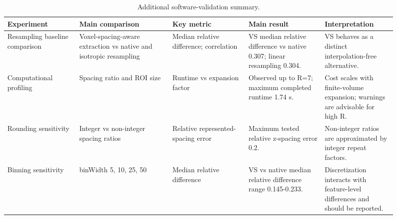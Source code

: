 \begin{table}[htbp]
\centering
\small
\caption{Additional software-validation summary.}
\begin{tabular}{p{0.17\linewidth}p{0.22\linewidth}p{0.18\linewidth}p{0.18\linewidth}p{0.17\linewidth}}
\toprule
Experiment & Main comparison & Key metric & Main result & Interpretation \\
\midrule
Resampling baseline comparison & Voxel-spacing-aware extraction vs native and isotropic resampling & Median relative difference; correlation & VS median relative difference vs native 0.307; linear resampling 0.304. & VS behaves as a distinct interpolation-free alternative. \\
Computational profiling & Spacing ratio and ROI size & Runtime vs expansion factor & Observed up to R=7; maximum completed runtime 1.74 s. & Cost scales with finite-volume expansion; warnings are advisable for high R. \\
Rounding sensitivity & Integer vs non-integer spacing ratios & Relative represented-spacing error & Maximum tested relative z-spacing error 0.2. & Non-integer ratios are approximated by integer repeat factors. \\
Binning sensitivity & binWidth 5, 10, 25, 50 & Median relative difference & VS vs native median relative difference range 0.145-0.233. & Discretization interacts with feature-level differences and should be reported. \\
\bottomrule
\end{tabular}
\end{table}
